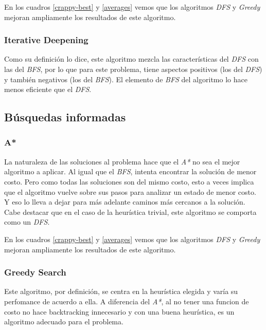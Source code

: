 \documentclass[a4paper,10pt]{article}
\begin{document}
    En los cuadros \ref{crappy-best} y \ref{averages} vemos que los algoritmos \textit{DFS} y \textit{Greedy} mejoran ampliamente los resultados de este algoritmo.

    \subsubsection{Iterative Deepening}

    Como su definición lo dice, este algoritmo mezcla las características del \textit{DFS} con las del \textit{BFS}, por lo que para este problema, tiene aspectos positivos (los del 
    \textit{DFS}) y también negativos (los del \textit{BFS}). 
    El elemento de \textit{BFS} del algoritmo lo hace menos eficiente que el \textit{DFS}.

\subsection{Búsquedas informadas}
    
    \subsubsection{A*}
    
    La naturaleza de las soluciones al problema hace que el \textit{A*} no sea el mejor algoritmo a aplicar. Al igual que el \textit{BFS}, intenta encontrar la solución de menor costo.
    Pero como todas las soluciones son del mismo costo, esto a veces implica que el algoritmo vuelve sobre sus pasos para analizar un estado de menor costo.
    Y eso lo lleva a dejar para más adelante caminos más cercanos a la solución. \\
    Cabe destacar que en el caso de la heurística trivial, este algoritmo se comporta como un \textit{DFS}.

    En los cuadros \ref{crappy-best} y \ref{averages} vemos que los algoritmos \textit{DFS} y \textit{Greedy} mejoran ampliamente los resultados de este algoritmo.

    \subsubsection{Greedy Search}
    
    Este algoritmo, por definición, se centra en la heurística elegida y varía su perfomance de acuerdo a ella.
    A diferencia del \textit{A*}, al no tener una funcion de costo no hace backtracking innecesario y con una buena heurística, es un algoritmo adecuado para el problema.
\end{document}
